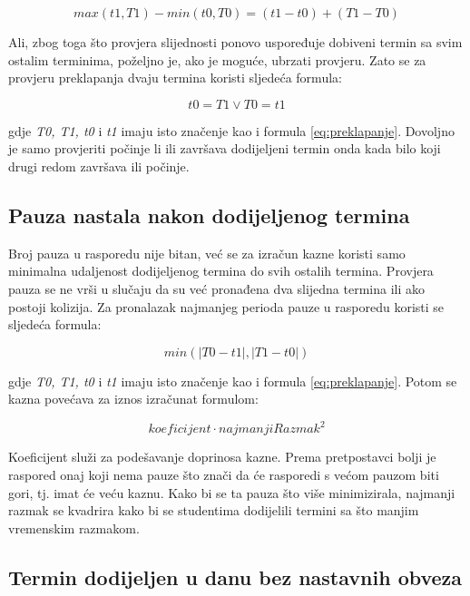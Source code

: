 \documentclass[times, utf8, zavrsni]{fer}
\begin{document}
\begin{equation}
max(t1, T1) - min(t0, T0) = (t1 - t0) + (T1  - T0)
\label{eq:slijednost-long}
\end{equation}

Ali, zbog toga što provjera slijednosti ponovo uspoređuje dobiveni termin sa svim ostalim terminima, poželjno je, ako je moguće, ubrzati provjeru. Zato se za provjeru preklapanja dvaju termina koristi sljedeća formula:

\begin{equation}
t0 = T1 \lor T0 = t1
\label{eq:slijednost-short}
\end{equation}

gdje \emph{T0, T1, t0} i \emph{t1} imaju isto značenje kao i formula \ref{eq:preklapanje}. Dovoljno je samo provjeriti počinje li ili završava dodijeljeni termin onda kada bilo koji drugi redom završava ili počinje.

\subsection{Pauza nastala nakon dodijeljenog termina}

Broj pauza u rasporedu nije bitan, već se za izračun kazne koristi samo minimalna udaljenost dodijeljenog termina do svih ostalih termina. Provjera pauza se ne vrši u slučaju da su već pronađena dva slijedna termina ili ako postoji kolizija. Za pronalazak najmanjeg perioda pauze u rasporedu koristi se sljedeća formula:

\begin{equation}
min(|T0 - t1|, |T1 - t0|)
\label{eq:min-rupa}
\end{equation}

\noindent
gdje \emph{T0, T1, t0} i \emph{t1} imaju isto značenje kao i formula \ref{eq:preklapanje}. Potom se kazna povećava za iznos izračunat formulom:

\begin{equation}
koeficijent \cdot najmanjiRazmak^2
\label{eq:min-rupa-kazna}
\end{equation}

Koeficijent služi za podešavanje doprinosa kazne. Prema pretpostavci bolji je raspored onaj koji nema pauze što znači da će rasporedi s većom pauzom biti gori, tj. imat će veću kaznu. Kako bi se ta pauza što više minimizirala, najmanji razmak se kvadrira kako bi se studentima dodijelili termini sa što manjim vremenskim razmakom.

\subsection{Termin dodijeljen u danu bez nastavnih obveza}
\end{document}
